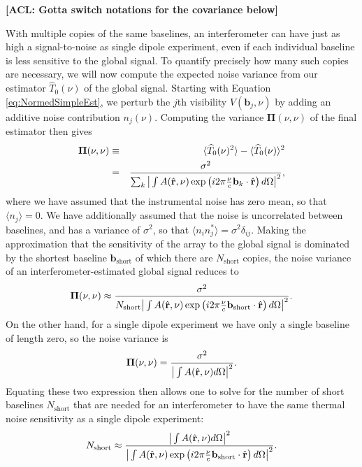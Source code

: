 \documentclass[twolcolumn,apj,iop,numberedappendix]{emulateapj}
\newcommand{\rhat}{\hat{\mathbf{r}}}
\newcommand{\acl}[1]{{\color{red} \textbf{[ACL:  #1]}}}
\begin{document}
\acl{Gotta switch notations for the covariance below}

With multiple copies of the same baselines, an interferometer can have just as high a signal-to-noise as single dipole experiment, even if each individual baseline is less sensitive to the global signal. To quantify precisely how many such copies are necessary, we will now compute the expected noise variance from our estimator $\widehat{T}_0 (\nu) $ of the global signal. Starting with Equation \eqref{eq:NormedSimpleEst}, we perturb the $j$th visibility $V(\mathbf{b}_j, \nu)$ by adding an additive noise contribution $n_j (\nu)$. Computing the variance $\boldsymbol \Pi(\nu,\nu)$ of the final estimator then gives
\begin{eqnarray}
\boldsymbol \Pi(\nu,\nu) &\equiv& \langle \widehat{T}_0 (\nu)^2 \rangle - \langle  \widehat{T}_0 (\nu) \rangle^2 \nonumber \\
&=&  \frac{\sigma^2}{ \sum_k \big{|} \int  A(\rhat, \nu) \exp\left(i 2\pi \frac{\nu }{c}\mathbf{b}_k \cdot \rhat \right)d\Omega \big{|}^2},
\end{eqnarray}
where we have assumed that the instrumental noise has zero mean, so that $\langle n_j \rangle = 0$. We have additionally assumed that the noise is uncorrelated between baselines, and has a variance of $\sigma^2$, so that $\langle n_i n_j^* \rangle = \sigma^2 \delta_{ij}$. Making the approximation that the sensitivity of the array to the global signal is dominated by the shortest baseline $\mathbf{b}_\textrm{short}$ of which there are $N_\textrm{short}$ copies, the noise variance of an interferometer-estimated global signal reduces to
\begin{equation}
\boldsymbol \Pi(\nu,\nu) \approx \frac{\sigma^2}{ N_\textrm{short} \big{|} \int  A(\rhat, \nu) \exp\left(i 2\pi \frac{\nu }{c}\mathbf{b}_\textrm{short} \cdot \rhat \right)d\Omega \big{|}^2}.
\end{equation}
On the other hand, for a single dipole experiment we have only a single baseline of length zero, so the noise variance is
\begin{equation}
\boldsymbol \Pi(\nu,\nu) = \frac{\sigma^2}{\big{|} \int  A(\rhat, \nu) d\Omega \big{|}^2}.
\end{equation}
Equating these two expression then allows one to solve for the number of short baselines $N_\textrm{short}$ that are needed for an interferometer to have the same thermal noise sensitivity as a single dipole experiment:
\begin{equation}
N_\textrm{short} \approx  \frac{\big{|} \int  A(\rhat, \nu) d\Omega \big{|}^2}{  \big{|} \int  A(\rhat, \nu) \exp\left(i 2\pi \frac{\nu }{c}\mathbf{b}_\textrm{short} \cdot \rhat \right)d\Omega \big{|}^2}.
\end{equation}
\end{document}
